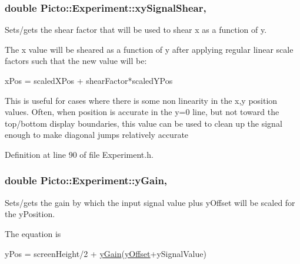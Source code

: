 \hypertarget{class_picto_1_1_experiment_a46cb8ba580d801935254ab8c7d684c0b}{
\subsubsection[{xy\-Signal\-Shear}]{\setlength{\rightskip}{0pt plus 5cm}double Picto\-::\-Experiment\-::xy\-Signal\-Shear\hspace{0.3cm}{\ttfamily [read]}, {\ttfamily [write]}}}\label{class_picto_1_1_experiment_a46cb8ba580d801935254ab8c7d684c0b}


Sets/gets the shear factor that will be used to shear x as a function of y. 

The x value will be sheared as a function of y after applying regular linear scale factors such that the new value will be\-:
\begin{DoxyCode}
xPos = scaledXPos + shearFactor*scaledYPos 
\end{DoxyCode}
 This is useful for cases where there is some non linearity in the x,y position values. Often, when position is accurate in the y=0 line, but not toward the top/bottom display boundaries, this value can be used to clean up the signal enough to make diagonal jumps relatively accurate 

Definition at line 90 of file Experiment.\-h.

\hypertarget{class_picto_1_1_experiment_a9200e0644a2c450dad16aaa59864fcf9}{
\subsubsection[{y\-Gain}]{\setlength{\rightskip}{0pt plus 5cm}double Picto\-::\-Experiment\-::y\-Gain\hspace{0.3cm}{\ttfamily [read]}, {\ttfamily [write]}}}\label{class_picto_1_1_experiment_a9200e0644a2c450dad16aaa59864fcf9}


Sets/gets the gain by which the input signal value plus y\-Offset will be scaled for the y\-Position. 

The equation is
\begin{DoxyCode}
yPos = screenHeight/2 + \hyperlink{class_picto_1_1_experiment_a9200e0644a2c450dad16aaa59864fcf9}{yGain}(\hyperlink{class_picto_1_1_experiment_a26e13838e01181ba7504742f4034336f}{yOffset}+ySignalValue) 
\end{DoxyCode}


